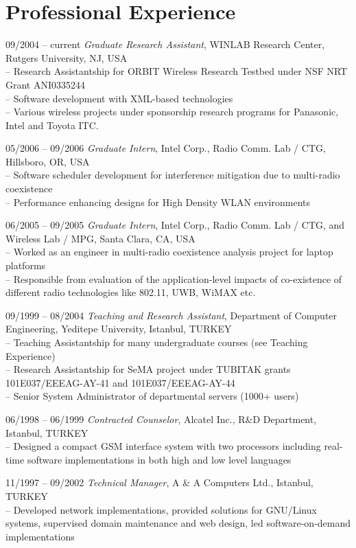 \documentclass[10pt]{article}
\begin{document}
\section{Professional Experience}
\begin{CV}
\item[09/2004 -- current] \emph{Graduate Research Assistant}, WINLAB Research
Center, Rutgers University, NJ, USA \\
-- Research Assistantship for ORBIT Wireless Research Testbed under
NSF NRT Grant ANI0335244\\
-- Software development with XML-based technologies\\
-- Various wireless projects under sponsorship research programs for Panasonic,
Intel and Toyota ITC.
\item[05/2006 -- 09/2006] \emph{Graduate Intern}, Intel Corp., Radio Comm. Lab /
CTG, Hillsboro, OR, USA \\
-- Software scheduler development for interference mitigation due to multi-radio
coexistence\\
-- Performance enhancing designs for High Density WLAN environments
\item[06/2005 -- 09/2005] \emph{Graduate Intern}, Intel Corp., Radio Comm. Lab /
CTG, and Wireless Lab / MPG, Santa Clara, CA, USA \\
-- Worked as an engineer in multi-radio coexistence analysis project
for laptop platforms\\
-- Responsible from evaluation of the application-level impacts of co-existence
of different radio technologies like 802.11, UWB, WiMAX etc.
\item[09/1999 -- 08/2004] \emph{Teaching and Research Assistant}, Department of
Computer Engineering, Yeditepe University, Istanbul, TURKEY \\
-- Teaching Assistantship for many undergraduate courses (see Teaching
Experience)\\
-- Research Assistantship for SeMA project under TUBITAK grants
101E037/EEEAG-AY-41 and 101E037/EEEAG-AY-44 \\
-- Senior System Administrator of departmental servers (1000+ users)
\item[06/1998 -- 06/1999] \emph{Contracted Counselor}, Alcatel Inc.,
R\&D Department, Istanbul, TURKEY \\
-- Designed a compact GSM interface system with two processors including
real-time software implementations in both high and low level languages
\item[11/1997 -- 09/2002] \emph{Technical Manager}, A \& A Computers Ltd.,
Istanbul, TURKEY \\
-- Developed network implementations, provided solutions for GNU/Linux systems,
supervised domain maintenance and web design, led software-on-demand
implementations
\end{CV}
\end{document}

